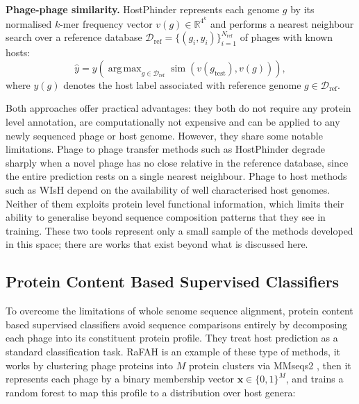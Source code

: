 \noindent\textbf{Phage-phage similarity.} HostPhinder \cite{villarroel2016hostphinder} represents each 
genome $g$ by its normalised $k$-mer frequency vector $v(g) \in \mathbb{R}^{4^k}$ and performs a 
nearest neighbour search over a reference database $\mathcal{D}_{\text{ref}} = \{(g_i, y_i)\}_{i=1}^{N_{\text{ref}}}$ 
of phages with known hosts:
\begin{equation*}
\hat{y} = y\left( \operatorname{arg\,max}_{g \in \mathcal{D}_{\text{ref}}} \operatorname{sim}(v(g_{\text{test}}), 
v(g)) \right),
\end{equation*}
where $y(g)$ denotes the host label associated with reference genome $g \in \mathcal{D}_{\text{ref}}$.

Both approaches offer practical advantages: they both do not require any protein level annotation, are computationally 
not expensive and can be applied to any newly sequenced phage or host genome. However, they share some notable limitations. 
Phage to phage transfer methods such as HostPhinder degrade sharply when a novel phage has no close relative in the 
reference database, since the entire prediction rests on a single nearest neighbour. Phage to host methods such as 
WIsH depend on the availability of well characterised host genomes. Neither of them exploits protein level functional 
information, which limits their ability to generalise beyond sequence composition patterns that they see in training. 
These two tools represent only a small sample of the methods developed in this space; there are works that exist beyond 
what is discussed here.

\subsection{Protein Content Based Supervised Classifiers}
\label{sec2.2.2: protein content classifiers}
To overcome the limitations of whole senome sequence alignment, protein content based supervised classifiers avoid sequence 
comparisons entirely by decomposing each phage into its constituent protein profile. They treat host prediction as a standard 
classification task. RaFAH \cite{coutinho2021rafah} is an example of these type of methods, it works 
by clustering phage proteins into $M$ protein clusters via MMseqs2 \cite{steinegger2017mmseqs2}, then it represents 
each phage by a binary membership vector $\mathbf{x} \in \{0,1\}^M$, and trains a random forest to map this profile to 
a distribution over host genera:

